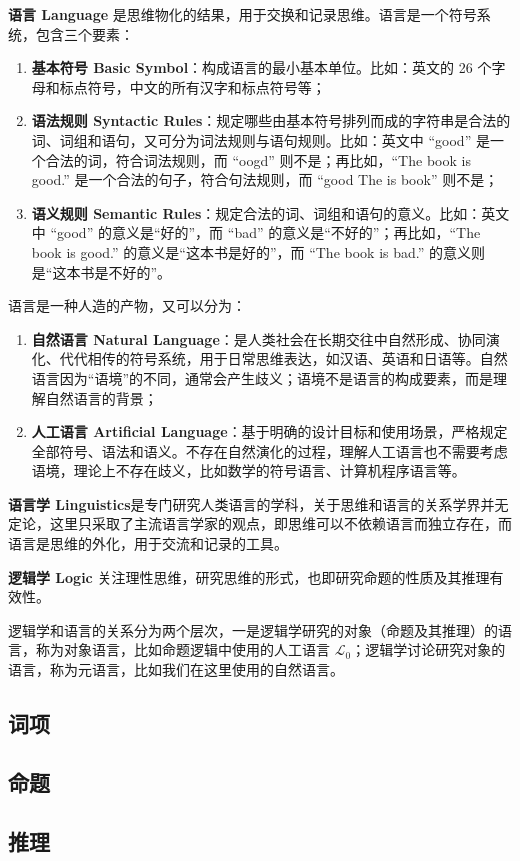 \textbf{语言 Language} 是思维物化的结果，用于交换和记录思维。语言是一个符号系统，包含三个要素：
\begin{enumerate}
    \item \textbf{基本符号 Basic Symbol}：构成语言的最小基本单位。比如：英文的 26 个字母和标点符号，中文的所有汉字和标点符号等；
    \item \textbf{语法规则 Syntactic Rules}：规定哪些由基本符号排列而成的字符串是合法的词、词组和语句，又可分为词法规则与语句规则。比如：英文中 “good” 是一个合法的词，符合词法规则，而 “oogd” 则不是；再比如，“The book is good.” 是一个合法的句子，符合句法规则，而 “good The is book” 则不是；
    \item \textbf{语义规则 Semantic Rules}：规定合法的词、词组和语句的意义。比如：英文中 “good” 的意义是“好的”，而 “bad” 的意义是“不好的”；再比如，“The book is good.” 的意义是“这本书是好的”，而 “The book is bad.” 的意义则是“这本书是不好的”。
\end{enumerate}
语言是一种人造的产物，又可以分为：
\begin{enumerate}
    \item \textbf{自然语言 Natural Language}：是人类社会在长期交往中自然形成、协同演化、代代相传的符号系统，用于日常思维表达，如汉语、英语和日语等。自然语言因为“语境”的不同，通常会产生歧义；语境不是语言的构成要素，而是理解自然语言的背景；
    \item \textbf{人工语言 Artificial Language}：基于明确的设计目标和使用场景，严格规定全部符号、语法和语义。不存在自然演化的过程，理解人工语言也不需要考虑语境，理论上不存在歧义，比如数学的符号语言、计算机程序语言等。
\end{enumerate}
\vspace{1em}
\begin{note}
    \textbf{语言学 Linguistics}是专门研究人类语言的学科，关于思维和语言的关系学界并无定论，这里只采取了主流语言学家的观点，即思维可以不依赖语言而独立存在，而语言是思维的外化，用于交流和记录的工具。
\end{note}

\textbf{逻辑学 Logic} 关注理性思维，研究思维的形式，也即研究命题的性质及其推理有效性。

\begin{note}
    逻辑学和语言的关系分为两个层次，一是逻辑学研究的对象（命题及其推理）的语言，称为对象语言，比如命题逻辑中使用的人工语言 $\mathcal{L}_0$；逻辑学讨论研究对象的语言，称为元语言，比如我们在这里使用的自然语言。
\end{note}

\subsection{词项}

\subsection{命题}

\subsection{推理}



\newpage